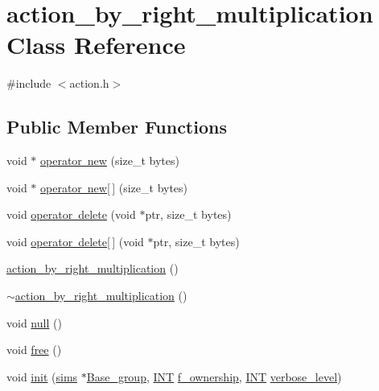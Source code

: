 \hypertarget{classaction__by__right__multiplication}{}\section{action\+\_\+by\+\_\+right\+\_\+multiplication Class Reference}
\label{classaction__by__right__multiplication}


{\ttfamily \#include $<$action.\+h$>$}

\subsection*{Public Member Functions}
\begin{DoxyCompactItemize}
\item 
void $\ast$ \mbox{\hyperlink{classaction__by__right__multiplication_a25a64e7959c984ea011db8987d55ef4a}{operator new}} (size\+\_\+t bytes)
\item 
void $\ast$ \mbox{\hyperlink{classaction__by__right__multiplication_a6b8ab88662014d39c4ae3aa2ad6082de}{operator new\mbox{[}$\,$\mbox{]}}} (size\+\_\+t bytes)
\item 
void \mbox{\hyperlink{classaction__by__right__multiplication_a4caca5182fa8f1bf771a60385334155f}{operator delete}} (void $\ast$ptr, size\+\_\+t bytes)
\item 
void \mbox{\hyperlink{classaction__by__right__multiplication_a26d610c6cd269cdb404bf2ca4e45f70f}{operator delete\mbox{[}$\,$\mbox{]}}} (void $\ast$ptr, size\+\_\+t bytes)
\item 
\mbox{\hyperlink{classaction__by__right__multiplication_a5364287ec4e3ee3c032d961d71b82260}{action\+\_\+by\+\_\+right\+\_\+multiplication}} ()
\item 
\mbox{\hyperlink{classaction__by__right__multiplication_a93099e0e51f0732bfdff3b20d610b506}{$\sim$action\+\_\+by\+\_\+right\+\_\+multiplication}} ()
\item 
void \mbox{\hyperlink{classaction__by__right__multiplication_ab15f9bddba66324e2fb7306e0fd21571}{null}} ()
\item 
void \mbox{\hyperlink{classaction__by__right__multiplication_a21d1c5373681ad7405d9ac8fec4e9aac}{free}} ()
\item 
void \mbox{\hyperlink{classaction__by__right__multiplication_a4bfd55df988a2da62c08ba412748ba51}{init}} (\mbox{\hyperlink{classsims}{sims}} $\ast$\mbox{\hyperlink{classaction__by__right__multiplication_a53daa3238df29627e3054e1e9257f9bb}{Base\+\_\+group}}, \mbox{\hyperlink{galois_8h_a09fddde158a3a20bd2dcadb609de11dc}{I\+NT}} \mbox{\hyperlink{classaction__by__right__multiplication_a0311dcdd5acad535093907b644cf3966}{f\+\_\+ownership}}, \mbox{\hyperlink{galois_8h_a09fddde158a3a20bd2dcadb609de11dc}{I\+NT}} \mbox{\hyperlink{simeon_8_c_a818073fbcc2f439e7c56952f67386122}{verbose\+\_\+level}})

\end{DoxyCompactItemize}
